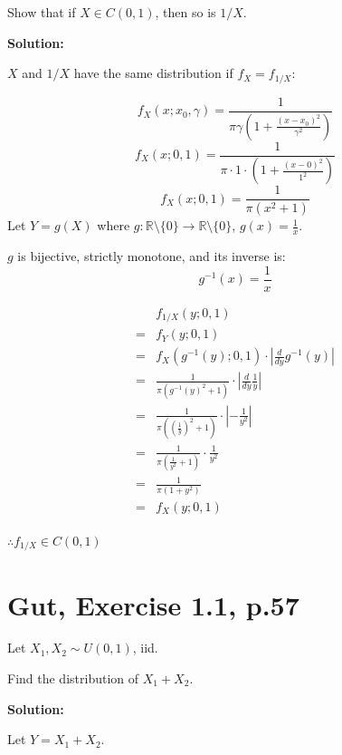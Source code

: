 \documentclass{article}
\begin{document}
Show that if \(X \in C(0,1)\), then so is \(1/X\).

\textbf{Solution:}

\(X\) and \(1/X\) have the same distribution if \(f_X=f_{1/X}\):

\[f_X(x;x_0,\gamma) = \frac{1}{\pi\gamma(1+\frac{(x-x_0)^2}{\gamma^2})}\]
\[f_X(x;0,1) = \frac{1}{\pi \cdot 1 \cdot (1+\frac{(x-0)^2}{1^2})}\]
\[f_X(x;0,1) = \frac{1}{\pi (x^2+1)}\]
Let \(Y=g(X)\) where \(g: \mathbb{R}\setminus\{0\}\to\mathbb{R}\setminus\{0\}\), \(g(x) = \frac{1}{x}\).

\(g\) is bijective, strictly monotone, and its inverse is:
\[g^{-1}(x) = \frac{1}{x}\]

\begin{align*}
 & f_{1/X}(y;0,1) \\
=& f_Y(y;0,1) \\
=& f_X(g^{-1}(y);0,1) \cdot |\frac{d}{dy}g^{-1}(y)| \\
=& \frac{1}{\pi (g^{-1}(y)^2+1)} \cdot |\frac{d}{dy}\frac{1}{y}| \\
=& \frac{1}{\pi ((\frac{1}{y})^2+1)} \cdot |-\frac{1}{y^2}| \\
=& \frac{1}{\pi (\frac{1}{y^2}+1)} \cdot \frac{1}{y^2} \\
=& \frac{1}{\pi (1+y^2)} \\
=& f_X(y;0,1) \\
\end{align*}

\(\therefore f_{1/X}\in C(0,1)\)

\section{Gut, Exercise 1.1, p.57}

Let \(X_1,X_2 \sim U(0,1)\), iid.

Find the distribution of \(X_1+X_2\).

\textbf{Solution:}

Let \(Y=X_1+X_2\).
\end{document}
